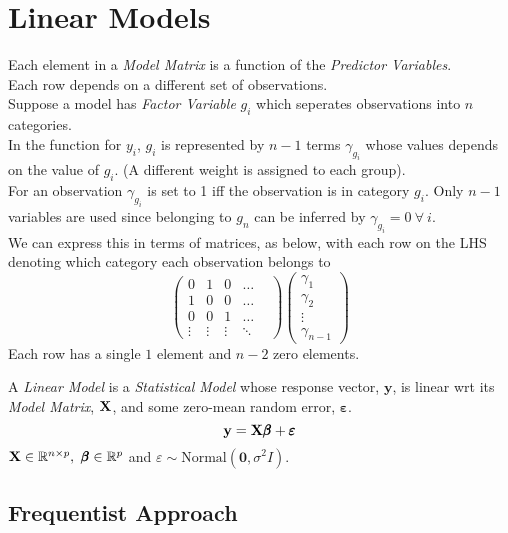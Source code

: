 \documentclass[11pt,a4paper]{article}
\begin{document}
\section{Linear Models}

Each element in a \textit{Model Matrix} is a function of the \textit{Predictor Variables}.\\
Each row depends on a different set of observations.\\

Suppose a model has \textit{Factor Variable} $g_i$ which seperates observations into $n$ categories.\\
In the function for $y_i$, $g_i$ is represented by $n-1$ terms $\gamma_{g_i}$ whose values depends on the value of $g_i$. (\ie A different weight is assigned to each group).\\
For an observation $\gamma_{g_i}$ is set to 1 iff the observation is in category $g_i$. Only $n-1$ variables are used since belonging to $g_n$ can be inferred by $\gamma_{g_i}=0\ \forall\ i$.\\
We can express this in terms of matrices, as below, with each row on the LHS denoting which category each observation belongs to
$$\begin{pmatrix}0&1&0&\dots&\\1&0&0&\dots\\0&0&1&\dots\\\vdots&\vdots&\vdots&\ddots\end{pmatrix}\begin{pmatrix}\gamma_1\\\gamma_2\\\vdots\\\gamma_{n-1}\end{pmatrix}$$
\nb Each row has a single $1$ element and $n-2$ zero elements.\\


A \textit{Linear Model} is a \textit{Statistical Model} whose response vector, $\textbf{y}$, is linear wrt its \textit{Model Matrix}, $\textbf{X}$, and some zero-mean random error, $\pmb\varepsilon$.
$$\textbf{y}=\textbf{X}\pmb\beta+\pmb\varepsilon$$
$\X\in\reals^{n\times p},\ \pmb\beta\in\reals^p$ and $\varepsilon\sim\text{Normal}(\pmb0,\sigma^2 I)$.

\subsection{Frequentist Approach}
\end{document}
